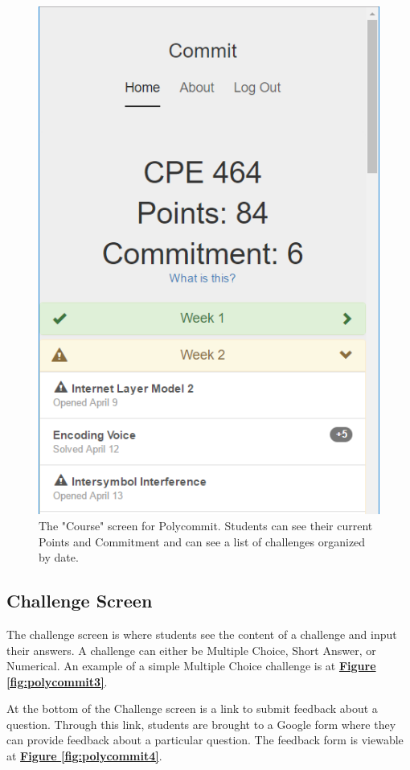 \begin{figure}
	\includegraphics{figures/polycommit-challenges}
	\caption{The "Course" screen for Polycommit. Students can see their current Points and Commitment and can see a list of challenges organized by date.}
	\label{fig:polycommit2}
\end{figure}

\subsection{Challenge Screen}
\par The challenge screen is where students see the content of a challenge and input their answers. A challenge can either be Multiple Choice, Short Answer, or Numerical. An example of a simple Multiple Choice challenge is at \textbf{\hyperref[fig:polycommit3]{Figure \ref*{fig:polycommit3}}}.

\par At the bottom of the Challenge screen is a link to submit feedback about a question. Through this link, students are brought to a Google form where they can provide feedback about a particular question. The feedback form is viewable at \textbf{\hyperref[fig:polycommit4]{Figure \ref*{fig:polycommit4}}}.

